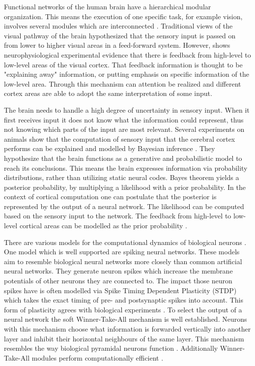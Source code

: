 Functional networks of the human brain have a hierarchical modular organization. This means the execution of one specific task, for example vision, involves several modules which are interconnected  \citep{hierarchicalBrain}. Traditional views of the visual pathway of the brain hypothesized that the sensory input is passed on from lower to higher visual areas in a feed-forward system. However, \citet{HierachicalBayesVisualCortex} shows  neurophysiological experimental evidence that there is feedback from high-level to low-level areas of the visual cortex. That feedback information is thought to be "explaining away" information, or putting emphasis on specific information of the low-level area. Through this mechanism can attention be realized and different cortex areas are able to adopt the same interpretation of some input.
 
The brain needs to handle a high degree of uncertainty in sensory input. When it first receives input it does not know what the information could represent, thus not knowing which parts of the input are most relevant. Several experiments on animals show that the computation of sensory input that the cerebral cortex performs can be explained and modelled by Bayesian inference \citep{neuralSubstrate, HierachicalBayesVisualCortex, anatomyOfInference}. They hypothesize that the brain functions as a generative and probabilistic model to reach its conclusions. This means the brain expresses information via probability distributions, rather than utilizing static neural codes. 
Bayes theorem yields a posterior probability, by multiplying a likelihood with a prior probability. In the context of cortical computation one can postulate that the posterior is represented by the output of a neural network. The likelihood can be computed based on the sensory input to the network. The feedback from high-level to low-level cortical areas can be modelled as the prior probability \citep{nessler}.

There are various models for the computational dynamics of biological neurons \citep{SpikingNeuronModelsBook}. One model which is well supported are spiking neural networks. These models aim to resemble biological neural networks more closely than common artificial neural networks. They generate neuron spikes which increase the membrane potentials of other neurons they are connected to. The impact those neuron spikes have is often modelled via Spike Timing Dependent Plasticity (STDP) which takes the exact timing of pre- and postsynaptic spikes into account. This form of plasticity agrees with biological experiments \citep{STDPFELDMAN, STDPDAN}. To select the output of a neural network the soft Winner-Take-All mechanism is well established. Neurons with this mechanism choose what information is forwarded vertically into another layer and inhibit their horizontal neighbours of the same layer.  This mechanism resembles the way biological pyramidal neurons function \citep{softWTA}. Additionally Winner-Take-All modules perform computationally efficient \citep{WTAPower}.

